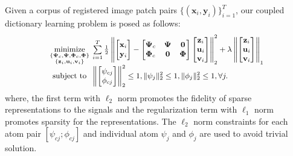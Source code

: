 \documentclass{article}
\begin{document}
Given a corpus of registered image patch pairs $\{(\mathbf{x}_i, \mathbf{y}_i) \}_{i=1}^T$, our coupled dictionary learning problem is posed as follows:
\begin{equation} \label{Eq:CoupledDL_Clean}
\small
\begin{array}{cl}
\underset{ 
	\begin{subarray}{c}
	\left\{ \boldsymbol{\Psi}_{c}, \boldsymbol{\Psi}, \boldsymbol{\Phi}_{c}, \boldsymbol{\Phi} \right\}  \\
	\{ \mathbf{z}_i, \mathbf{u}_i, \mathbf{v}_i \}
	\end{subarray}}
{ \text{minimize}}
&  \! \! \! \!
\sum\limits_{i=1}^T
\frac{1}{2}
\left\|
\begin{bmatrix}
\mathbf{x}_i \\ \mathbf{y}_i 
\end{bmatrix}
-
\begin{bmatrix}
\boldsymbol{\Psi}_{c} & \boldsymbol{\Psi} & \mathbf{0} \\
\boldsymbol{\Phi}_{c} & \mathbf{0} & \boldsymbol{\Phi} \\
\end{bmatrix}
\begin{bmatrix}
\mathbf{z}_i \\
\mathbf{u}_i \\
\mathbf{v}_i \\
\end{bmatrix}
\right\|_2^2
+
\lambda
\left\| 
\begin{bmatrix}
\mathbf{z}_i \\
\mathbf{u}_i \\
\mathbf{v}_i \\
\end{bmatrix} 
\right\|_1
\\
\text{subject to}
& \! \! \! \!
\left\| \begin{bmatrix} \psi_{cj} \\ \phi_{cj} \end{bmatrix} \right\|_2^2 \leq 1, 
\| \psi_j \|_2^2 \leq 1, \| \phi_j \|_2^2 \leq 1, \forall j.
\end{array}
\end{equation}
\noindent
where, the first term with $\ell_2$ norm promotes the fidelity of sparse representations to the signals and the regularization term with $\ell_1$ norm promotes sparsity for the representations. The $\ell_2$ norm constraints for each atom pair $[\psi_{cj} ; \phi_{cj}]$ and individual atom $\psi_j$ and $\phi_j$ are used to avoid trivial solution.
\end{document}
